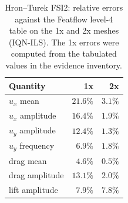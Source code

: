 \begin{table}[htbp]
	\centering
	\small
	\setlength{\tabcolsep}{5pt}
	\caption{Hron--Turek FSI2: relative errors against the Featflow level-4 table on the 1x and 2x meshes (IQN-ILS). The 1x errors were computed from the tabulated values in the evidence inventory.}
	\label{tab:hronturek_fsi2}
	\begin{tabular}{lrr}
		\toprule
		Quantity & 1x & 2x \\
		\midrule
		$u_x$ mean & $21.6\%$ & $3.1\%$ \\
		$u_x$ amplitude & $16.4\%$ & $1.9\%$ \\
		$u_y$ amplitude & $12.4\%$ & $1.3\%$ \\
		$u_y$ frequency & $6.9\%$ & $1.8\%$ \\
		drag mean & $4.6\%$ & $0.5\%$ \\
		drag amplitude & $13.1\%$ & $2.0\%$ \\
		lift amplitude & $7.9\%$ & $7.8\%$ \\
		\bottomrule
	\end{tabular}
\end{table}

